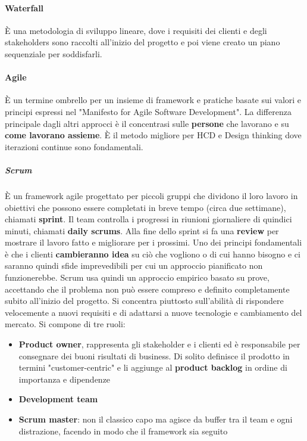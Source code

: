 \paragraph{Waterfall} È una metodologia di sviluppo lineare, dove i requisiti dei clienti e degli stakeholders sono raccolti all'inizio del progetto e poi viene creato un piano sequenziale per soddisfarli.
\paragraph{Agile} È un termine ombrello per un insieme di framework e pratiche basate sui valori e principi espressi nel "Manifesto for Agile Software Development". La differenza principale dagli altri approcci è il concentrasi sulle \textbf{persone} che lavorano e su \textbf{come lavorano assieme}. È il metodo migliore per HCD e Design thinking dove iterazioni continue sono fondamentali.

\subparagraph{Scrum}
È un framework agile progettato per piccoli gruppi che dividono il loro lavoro in obiettivi che possono essere completati in breve tempo (circa due settimane), chiamati \textbf{sprint}. Il team controlla i progressi in riunioni giornaliere di quindici minuti, chiamati \textbf{daily scrums}. Alla fine dello sprint si fa una \textbf{review} per mostrare il lavoro fatto e migliorare per i prossimi. Uno dei principi fondamentali è che i clienti \textbf{cambieranno idea} su ciò che vogliono o di cui hanno bisogno e ci saranno quindi sfide imprevedibili per cui un approccio pianificato non funzionerebbe. Scrum usa quindi un approccio empirico basato su prove, accettando che il problema non può essere compreso e definito completamente subito all'inizio del progetto. Si concentra piuttosto sull'abilità di rispondere velocemente a nuovi requisiti e di adattarsi a nuove tecnologie e cambiamento del mercato. Si compone di tre ruoli:
\begin{itemize}
	\item \textbf{Product owner}, rappresenta gli stakeholder e i clienti ed è responsabile per consegnare dei buoni risultati di business. Di solito definisce il prodotto in termini "customer-centric" e li aggiunge al \textbf{product backlog} in ordine di importanza e dipendenze
	\item \textbf{Development team}
	\item \textbf{Scrum master}: non il classico capo ma agisce da buffer tra il team e ogni distrazione, facendo in modo che il framework sia seguito
\end{itemize}